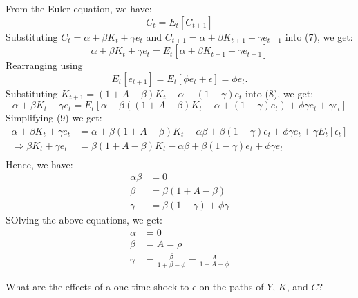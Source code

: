 \begin{solution}
    From the Euler equation, we have:
    \begin{equation}
        C_t = E_t\left[C_{t+1}\right]
    \end{equation}
    Substituting $C_t = \alpha  + \beta K_t + \gamma e_t$ and $C_{t+1} = \alpha  + \beta K_{t+1} + \gamma e_{t+1}$ into (7), we get:
    \begin{equation}
        \alpha  + \beta K_t + \gamma e_t = E_t\left[\alpha  + \beta K_{t+1} + \gamma e_{t+1}\right]
    \end{equation}
    Rearranging using $$E_t\left[e_{t+1}\right] = E_t \left[\phi e_t + \epsilon \right] = \phi e_t.$$
    Substituting $K_{t+1} = (1+A-\beta) K_t - \alpha - (1-\gamma) e_t$ into (8), we get:
    \begin{equation}
        \alpha  + \beta K_t + \gamma e_t = E_t\left[\alpha  + \beta ((1+A-\beta) K_t - \alpha + (1-\gamma) e_t) + \phi\gamma e_{t} + \gamma \epsilon_t \right]
    \end{equation}
    Simplifying (9) we get:
    \begin{align*}
        \alpha  + \beta K_t + \gamma e_t &= \alpha  + \beta (1+A-\beta) K_t - \alpha \beta  + \beta (1-\gamma) e_t + \phi\gamma e_{t} + \gamma E_t\left[\epsilon_t\right] \\
        \Rightarrow \beta K_t + \gamma e_t &= \beta (1+A-\beta) K_t - \alpha \beta  + \beta (1-\gamma) e_t + \phi\gamma e_{t} \\
    \end{align*}
    Hence, we have:
    \begin{align*}
        \alpha \beta  &= 0 \\
        \beta &= \beta (1+A-\beta) \\
        \gamma &= \beta (1-\gamma) + \phi\gamma
    \end{align*}
    SOlving the above equations, we get:
    \begin{align*}
        \alpha &= 0 \\
        \beta &= A = \rho \\
        \gamma &= \frac{\beta}{1+\beta -\phi} = \frac{A}{1+A -\phi}
    \end{align*}
\end{solution}

\begin{problem}[4]
    What are the effects of a one-time shock to $\epsilon $ on the paths of $Y$, $K$, and $C$?
\end{problem}

